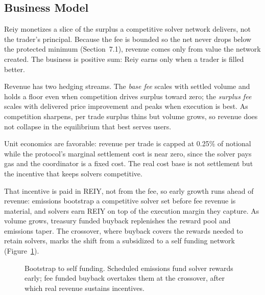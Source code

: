 \documentclass[10pt,sigconf,nonacm]{acmart}
\theoremstyle{reiythm}
\begin{document}
\subsection{Business Model}

Reiy monetizes a slice of the surplus a competitive solver network delivers, not
the trader's principal. Because the fee is bounded so the net never drops below the
protected minimum (Section~7.1), revenue comes only from value the network created.
The business is positive sum: Reiy earns only when a trader is filled better.

Revenue has two hedging streams. The \emph{base fee} scales with settled volume and
holds a floor even when competition drives surplus toward zero; the \emph{surplus
fee} scales with delivered price improvement and peaks when execution is best. As
competition sharpens, per trade surplus thins but volume grows, so revenue does not
collapse in the equilibrium that best serves users.

Unit economics are favorable: revenue per trade is capped at 0.25\% of notional while
the protocol's marginal settlement cost is near zero, since the solver pays gas and
the coordinator is a fixed cost. The real cost base is not settlement but the
incentive that keeps solvers competitive.

That incentive is paid in REIY, not from the fee, so early growth runs ahead of
revenue: emissions bootstrap a competitive solver set before fee revenue is material,
and solvers earn REIY on top of the execution margin they capture. As volume grows,
treasury funded buyback replenishes the reward pool and emissions taper. The
crossover, where buyback covers the rewards needed to retain solvers, marks the shift
from a subsidized to a self funding network (Figure~\ref{fig:crossover}).

\begin{figure}[htbp]
  \centering
  \caption{Bootstrap to self funding. Scheduled emissions fund solver rewards early;
    fee funded buyback overtakes them at the crossover, after which real revenue
    sustains incentives.}
  \label{fig:crossover}
\end{figure}
\end{document}
